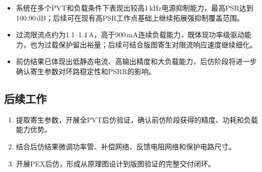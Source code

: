 \documentclass[a4paper, 12pt]{article}
\begin{document}
\begin{itemize}[leftmargin=2em]
  \item 系统在多个PVT和负载条件下表现出较高1\,kHz电源抑制能力，最高PSR达到100.90\,dB；后续可在现有高PSR工作点基础上继续拓展强抑制覆盖范围。
  \item 过流限流点约为1.1--1.4\,A，高于900\,mA连续负载能力，既体现功率级驱动能力，也为过载保护留出裕量；后续可结合版图寄生对限流响应速度继续细化。
  \item 前仿结果已体现出低静态电流、高输出精度和大负载能力，后仿阶段将进一步确认寄生参数对环路稳定性和PSRR的影响。
\end{itemize}

\subsection{后续工作}

\begin{enumerate}[leftmargin=2em]
  \item 提取寄生参数，开展全PVT后仿验证，确认前仿阶段获得的精度、功耗和负载能力优势。
  \item 结合后仿结果微调功率管、补偿网络、反馈电阻网络和保护电路尺寸。
  \item 开展PEX后仿，形成从原理图设计到版图验证的完整交付闭环。
\end{enumerate}

\clearpage
{}
\end{document}
